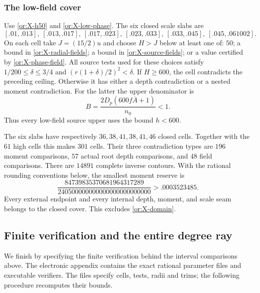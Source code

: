 \subsubsection{The low-field cover}

Use \eqref{or:X-h50} and \eqref{or:X-low-phase}.
The six closed scale slabs are
\begin{equation}\label{or:X-slabs}
 [.01,.013],\ [.013,.017],\ [.017,.023],\ [.023,.033],\
 [.033,.045],\ [.045,.061002].
\end{equation}
On each cell take $J=(15/2)u$ and choose $H>J$ below at least one
of: $50$; a bound in \eqref{or:X-radial-fields}; a bound in
\eqref{or:X-source-fields}; or a value certified by
\eqref{or:X-phase-field}.  All source tests used for these choices
satisfy $1/200\le\delta\le3/4$ and
$(r(1+\delta)/2)^2<\delta$.
If $H\ge600$, the cell contradicts the preceding ceiling.
Otherwise it has either a depth contradiction or a nested
moment contradiction.  For the latter the upper denominator is
\begin{equation}\label{or:X-low-denominator}
                   B=\frac{2D_p(600f\overline A+1)}{n_0}<1.
\end{equation}
Thus every low-field source upper uses the bound $h<600$.

The six slabs have respectively $36,38,41,38,41,46$ closed cells.
Together with the $61$ high cells this makes $301$ cells.  Their
three contradiction types are $196$ moment comparisons, $57$ actual
root depth comparisons, and $48$ field comparisons.  There are
$14891$ complete inverse contours.  With the rational rounding
conventions below, the smallest moment reserve is
\begin{equation}\label{or:X-reserve}
       \frac{84739835370681964317289}
            {240500000000000000000000000}>.0003523485.
\end{equation}
Every external endpoint and every internal depth, moment, and scale
seam belongs to the closed cover.  This excludes \eqref{or:X-domain}.

\subsection{Finite verification and the entire degree ray}
\label{or:finite-verification}

We finish by specifying the finite verification behind the interval
comparisons above.  The electronic appendix contains the exact
rational parameter files and executable verifiers.  The files specify
cells, tests, radii and trims; the following procedure recomputes
their bounds.

